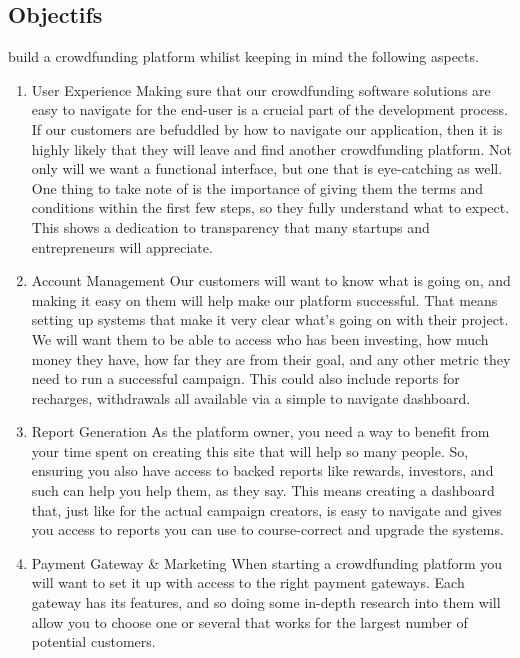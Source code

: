 \subsection*{Objectifs}
build a crowdfunding platform whilist keeping in mind the following aspects.
\begin{enumerate}
    \item
          User Experience
          Making sure that our crowdfunding software solutions are easy to navigate for the end-user is a crucial part of the development process. If our customers are befuddled by how to navigate our application, then it is highly likely that they will leave and find another crowdfunding platform. Not only will we want a functional interface, but one that is eye-catching as well.
          One thing to take note of is the importance of giving them the terms and conditions within the first few steps, so they fully understand what to expect. This shows a dedication to transparency that many startups and entrepreneurs will appreciate.
    \item
          Account Management
          Our customers will want to know what is going on, and making it easy on them will help make our platform successful. That means setting up systems that make it very clear what’s going on with their project. We will want them to be able to access who has been investing, how much money they have, how far they are from their goal, and any other metric they need to run a successful campaign. This could also include reports for recharges, withdrawals all available via a simple to navigate dashboard.
    \item

          Report Generation
          As the platform owner, you need a way to benefit from your time spent on creating this site that will help so many people. So, ensuring you also have access to backed reports like rewards, investors, and such can help you help them, as they say. This means creating a dashboard that, just like for the actual campaign creators, is easy to navigate and gives you access to reports you can use to course-correct and upgrade the systems.
    \item
          Payment Gateway \& Marketing
          When starting a crowdfunding platform you will want to set it up with access to the right payment gateways. Each gateway has its features, and so doing some in-depth research into them will allow you to choose one or several that works for the largest number of potential customers.
\end{enumerate}




